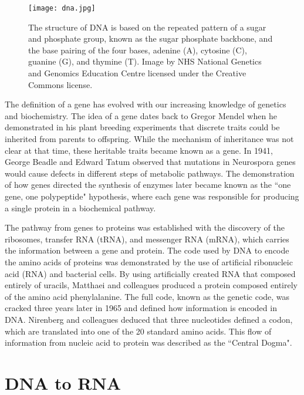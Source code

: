 \begin{figure}[!ht]
   \centering
   \texttt{[image: dna.jpg]}
   \caption[The structure of DNA]{The structure of DNA is based on the repeated pattern of a sugar and phosphate group, known as the sugar phosphate backbone, and the base pairing of the four bases, adenine (A), cytosine (C), guanine (G), and thymine (T). Image by NHS National Genetics and Genomics Education Centre licensed under the Creative Commons license.}
   \label{fig:dna}
\end{figure}

The definition of a gene has evolved with our increasing knowledge of genetics and biochemistry\cite{pmid17567988}. The idea of a gene dates back to Gregor Mendel when he demonstrated in his plant breeding experiments that discrete traits could be inherited from parents to offspring. While the mechanism of inheritance was not clear at that time, these heritable traits became known as a gene. In 1941, George Beadle and Edward Tatum observed that mutations in Neurospora genes would cause defects in different steps of metabolic pathways\cite{Beadle15111941}. The demonstration of how genes directed the synthesis of enzymes later became known as the ``one gene, one polypeptide" hypothesis, where each gene was responsible for producing a single protein in a biochemical pathway.

The pathway from genes to proteins was established with the discovery of the ribosomes\cite{pmid14381428}, transfer RNA (tRNA)\cite{pmid13538965}, and messenger RNA (mRNA)\cite{BRENNER1961}, which carries the information between a gene and protein. The code used by DNA to encode the amino acids of proteins was demonstrated by the use of artificial ribonucleic acid (RNA) and bacterial cells\cite{pmid14471390}. By using artificially created RNA that composed entirely of uracils, Matthaei and colleagues produced a protein composed entirely of the amino acid phenylalanine. The full code, known as the genetic code, was cracked three years later in 1965\cite{pmid5330357} and defined how information is encoded in DNA. Nirenberg and colleagues deduced that three nucleotides defined a codon, which are translated into one of the 20 standard amino acids. This flow of information from nucleic acid to protein was described as the ``Central Dogma"\cite{crick1958protein}.

\section{DNA to RNA}


